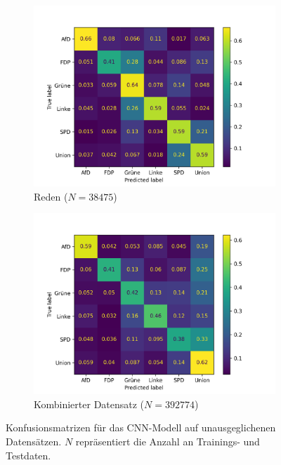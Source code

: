 \begin{figure}[H]
    \hfill
    \begin{subfigure}{0.49\textwidth}
        \includegraphics[width=\textwidth]{data/images/modeling/cnn/speeches_confusion_matrix.png}
        \caption{Reden (\(N=\num{38475}\))}
        \label{sfig:confusionMatrixCnnSpeeches}
    \end{subfigure}
    \hfill
    \begin{subfigure}{0.49\textwidth}
        \includegraphics[width=\textwidth]{data/images/modeling/cnn/all_confusion_matrix.png}
        \caption{Kombinierter Datensatz (\(N=\num{392774}\))}
        \label{sfig:confusionMatrixCnnAll}
    \end{subfigure}
    \caption[Konfusionsmatrizen für das \ac{CNN}-Modell auf unausgeglichenen Datensätzen]{Konfusionsmatrizen für das \ac{CNN}-Modell auf unausgeglichenen Datensätzen. $N$ repräsentiert die Anzahl an Trainings- und Testdaten.} \label{fig:confusionMatrixCnn}
\end{figure}

